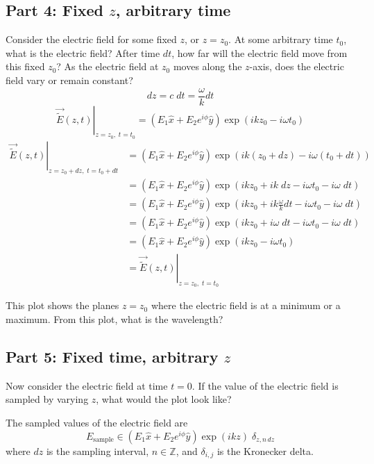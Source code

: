 \documentclass{article}
\begin{document}
\subsection{Part 4: Fixed $z$, arbitrary time}
Consider the electric field for some fixed $z$, or $z=z_0$.  At some arbitrary time $t_0$, what is the electric field?  After time $dt$,  how far will the electric field move from this fixed $z_0$?  As the electric field at $z_0$ moves along the $z$-axis, does the electric field vary or remain constant?
\begin{equation}
    dz = c\;dt = \frac{\omega}{k}dt
\end{equation}
\begin{equation}
    \left.\vec{\widetilde{E}}\left(z,t\right)\right\rvert_{z=z_0,\;t=t_0} = \left(E_1\hat{x} + E_2e^{i\phi}\hat{y}\right) \exp \left(ikz_0- i \omega t_0\right)
\end{equation}
\begin{align}
     \left.\vec{\widetilde{E}}\left(z,t\right)\right\rvert_{z=z_0+dz,\;t=t_0+dt} &= \left(E_1\hat{x} + E_2e^{i\phi}\hat{y}\right) \exp \left(ik(z_0+dz)- i \omega (t_0+dt)\right)   \\
     &= \left(E_1\hat{x} + E_2e^{i\phi}\hat{y}\right) \exp \left(ikz_0+ik\;dz- i \omega t_0- i \omega\;dt\right)   \\
     &= \left(E_1\hat{x} + E_2e^{i\phi}\hat{y}\right) \exp \left(ikz_0+ik\frac{\omega}{k}dt- i \omega t_0- i \omega\;dt\right)   \\
     &= \left(E_1\hat{x} + E_2e^{i\phi}\hat{y}\right) \exp \left(ikz_0+i\omega\; dt- i \omega t_0- i \omega\;dt\right)   \\
     &= \left(E_1\hat{x} + E_2e^{i\phi}\hat{y}\right) \exp \left(ikz_0- i \omega t_0\right)   \\
     &=\left.\vec{\widetilde{E}}\left(z,t\right)\right\rvert_{z=z_0,\;t=t_0}
\end{align}

This plot shows the planes $z=z_0$ where the electric field is at a minimum or a maximum.  From this plot, what is the wavelength?
\subsection{Part 5: Fixed time, arbitrary $z$}
Now consider the electric field at time $t=0$.  If the value of the electric field is sampled by varying $z$, what would the plot look like?

The sampled values of the electric field are
\begin{equation}
    E_{\text{sample}} \in \left(E_1\hat{x} + E_2e^{i\phi}\hat{y}\right) \exp \left(ikz\right)   \;\delta_{z,n\,dz}
\end{equation}
where $dz$ is the sampling interval, $n \in \mathbb{Z}$, and $\delta_{i,j}$ is the Kronecker delta.
\end{document}
